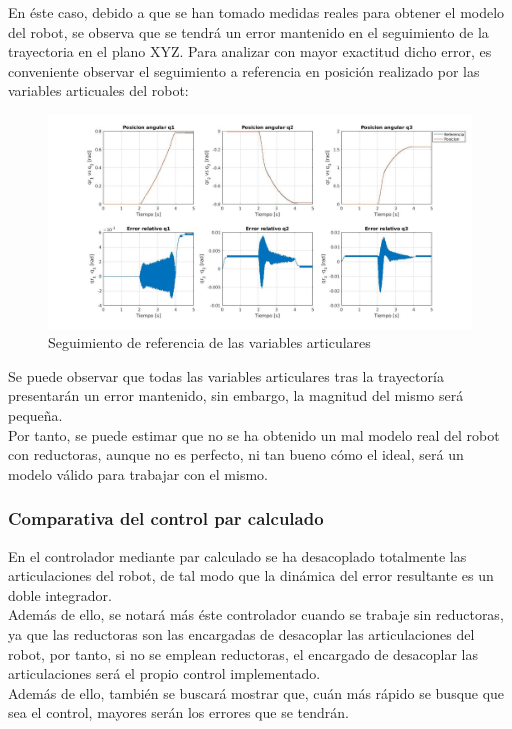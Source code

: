\begin{itemize}
	En éste caso, debido a que se han tomado medidas reales para obtener el modelo del robot, se observa que se tendrá un error mantenido en el seguimiento de la trayectoria en el plano XYZ. Para analizar con mayor exactitud dicho error, es conveniente observar el seguimiento a referencia en posición realizado por las variables articuales del robot:

	\begin{figure}[h!]
		\centering
		\includegraphics[width=.8\textwidth]{exp3_posPDrealCR}
		\caption{Seguimiento de referencia de las variables articulares}
	\end{figure}

Se puede observar que todas las variables articulares tras la trayectoría presentarán un error mantenido, sin embargo, la magnitud del mismo será pequeña.\\
Por tanto, se puede estimar que no se ha obtenido un mal modelo real del robot con reductoras, aunque no es perfecto, ni tan bueno cómo el ideal, será un modelo válido para trabajar con el mismo.

\end{itemize}

\newpage
\subsubsection{Comparativa del control par calculado}
En el controlador mediante par calculado se ha desacoplado totalmente las articulaciones del robot, de tal modo que la dinámica del error resultante es un doble integrador. \\
Además de ello, se notará más éste controlador cuando se trabaje sin reductoras, ya que las reductoras son las encargadas de desacoplar las articulaciones del robot, por tanto, si no se emplean reductoras, el encargado de desacoplar las articulaciones será el propio control implementado. \\
Además de ello, también se buscará mostrar que, cuán más rápido se busque que sea el control, mayores serán los errores que se tendrán.\\

